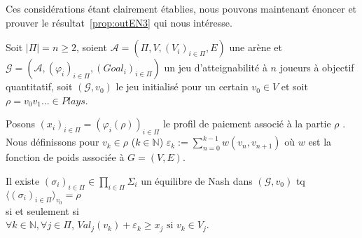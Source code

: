 Ces considérations étant clairement établies, nous pouvons maintenant énoncer et prouver le résultat~\ref{prop:outEN3} qui nous intéresse.
\begin{propriete}
	\label{prop:outEN3}
	Soit $|\Pi| = n \geq 2$,
	soient $\mathcal{A} = (\Pi, V, (V_{i})_{i\in\Pi}, E)$ une arène et $\mathcal{G} = (\mathcal{A}, (\varphi _{i})_{i\in\Pi}, (Goal_{i})_{i\in\Pi})$ un jeu d'atteignabilité à $n$ joueurs à objectif quantitatif, soit $(\mathcal{G}, v_{0})$ le jeu initialisé pour un certain $v_{0} \in V $ et soit $\rho = v_{0}v_{1}... \in Plays$. 
	
	Posons $(x_{i})_{i\in\Pi} = (\varphi _{i}(\rho))_{i\in\Pi}$ le profil de paiement associé à la partie $\rho$ . Nous définissons pour $v_{k} \in \rho$ ($k \in \mathbb{N}$)  $\varepsilon _{k} := \sum _{n= 0} ^{k-1} w(v_{n},v_{n+1})$ où $w$ est la fonction de poids associée à $G = (V,E)$.
	
	\begin{center}Il existe $ (\sigma _{i})_{i\in\Pi} \in \prod_{i\in\Pi} \Sigma _{i}$ un équilibre de Nash dans $(\mathcal{G},v_{0})$ tq $\langle (\sigma _{i})_{i \in \Pi}\rangle_{v_0} = \rho$\\ $\text{}$\\ si et seulement si\\$\text{}$\\  $ \forall k \in \mathbb{N}, \forall j \in \Pi$, $Val_{j}(v_{k}) + \varepsilon _{k} \geq x_j \text{  si } v_{k} \in V_{j}$.\end{center}
	
\end{propriete}

\setcounter{equation}{0}

